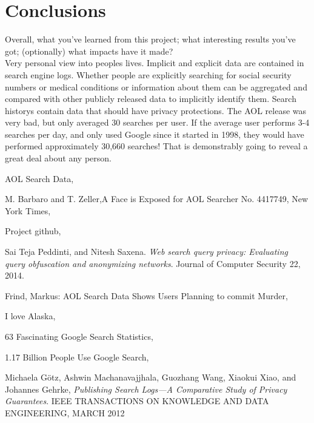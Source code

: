 \documentclass{article}
\begin{document}
\section{Conclusions}
Overall, what you've learned from this project; what interesting results you've got; (optionally) what impacts have it made?\\

Very personal view into peoples lives. Implicit and explicit data are contained in search engine logs. Whether people are explicitly searching for social security numbers or medical conditions or information about them can be aggregated and compared with other publicly released data to implicitly identify them. Search historys contain data that should have privacy protections. The AOL release was very bad, but only averaged 30 searches per user. If the average user performs 3-4 searches per day, and only used Google since it started in 1998, they would have performed approximately 30,660 searches! That is demonstrably going to reveal a great deal about any person.

\begin{thebibliography}{9}
AOL Search Data,
\\

M. Barbaro and T. Zeller,A Face is Exposed for AOL Searcher No. 4417749, New York Times,
\\

Project github,
\\

Sai Teja Peddinti, and Nitesh Saxena. 
\textit{Web search query privacy: Evaluating query obfuscation and anonymizing networks}. 
Journal of Computer Security 22, 2014.
 
Frind, Markus: AOL Search Data Shows Users Planning to commit Murder,
\\

I love Alaska,
\\

63 Fascinating Google Search Statistics,
\\

1.17 Billion People Use Google Search,
\\

Michaela Götz, Ashwin Machanavajjhala, Guozhang Wang, Xiaokui Xiao, and Johannes Gehrke,
\textit{Publishing Search Logs—A Comparative Study of Privacy Guarantees}.
IEEE TRANSACTIONS ON KNOWLEDGE AND DATA ENGINEERING, MARCH 2012

\end{thebibliography}
\end{document}
